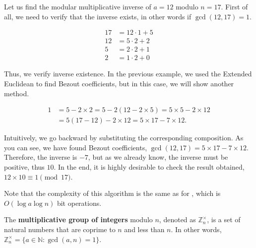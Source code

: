 \documentclass[../lecture-notes-148x210.tex]{subfiles}
\begin{document}
\begin{example}
    Let us find the modular multiplicative inverse of $a = 12$ modulo $n = 17$.
    First of all, we need to verify that the inverse exists, in other words if $\gcd(12, 17) = 1$.

    \begin{equation*}   
        \begin{aligned}
            17 &= 12 \cdot 1 + 5 \\
            12 &= 5 \cdot 2 + 2 \\
            5 &= 2 \cdot 2 + 1 \\
            2 &= 1 \cdot 2 + 0
        \end{aligned}
    \end{equation*}

    Thus, we verify inverse existence. In the previous example, we used 
    the Extended Euclidean  to find Bezout coefficients,
    but in this case, we will show another method.

    \begin{equation*}
        \begin{aligned}
            1 &= 5 - 2 \times 2 = 5 - 2(12 - 2 \times 5) = 5 \times 5 - 2 \times 12 \\
              &= 5(17 - 12) - 2 \times 12 = 5 \times 17 - 7 \times 12.
        \end{aligned}
    \end{equation*}

    Intuitively, we go backward by substituting the corresponding composition.
    As you can see, we have found Bezout coefficients, $\gcd(12, 17) = 5 \times 17 - 7 \times 12$.
    Therefore, the inverse is $-7$, but as we already know, the inverse must be positive, thus $10$.
    In the end, it is highly desirable to check the result obtained,~$12 \times 10 \equiv 1 \pmod{17}$.

\end{example}

\begin{remark}
    Note that the complexity of this algorithm is the same as for , which is $O(\log a \log n)$ bit operations.
\end{remark}

\begin{definition}
    The \textbf{multiplicative group of integers} modulo $n$, denoted as $\mathbb{Z}_n^{\times}$, is a set of natural numbers that are coprime to $n$ and less than $n$. In other words, $\mathbb{Z}_n^{\times} = \{a \in \mathbb{N}: \gcd(a, n) = 1\}$.
\end{definition}
\end{document}
